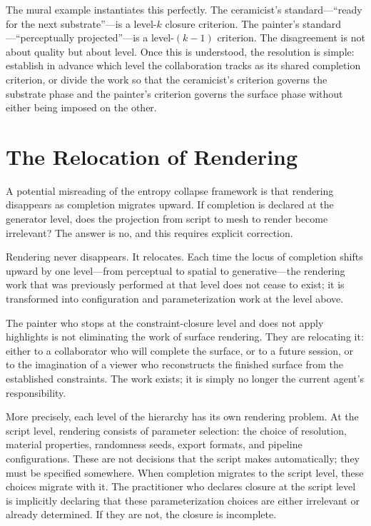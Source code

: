 \documentclass[12pt, twoside]{article}
\theoremstyle{plain}
\theoremstyle{definition}
\theoremstyle{remark}
\begin{document}
The mural example instantiates this perfectly. The ceramicist's standard---``ready for the next substrate''---is a level-$k$ closure criterion. The painter's standard---``perceptually projected''---is a level-$(k-1)$ criterion. The disagreement is not about quality but about level. Once this is understood, the resolution is simple: establish in advance which level the collaboration tracks as its shared completion criterion, or divide the work so that the ceramicist's criterion governs the substrate phase and the painter's criterion governs the surface phase without either being imposed on the other.

\section{The Relocation of Rendering}
\label{sec:relocation}

A potential misreading of the entropy collapse framework is that rendering disappears as completion migrates upward. If completion is declared at the generator level, does the projection from script to mesh to render become irrelevant? The answer is no, and this requires explicit correction.

Rendering never disappears. It relocates. Each time the locus of completion shifts upward by one level---from perceptual to spatial to generative---the rendering work that was previously performed at that level does not cease to exist; it is transformed into configuration and parameterization work at the level above.

The painter who stops at the constraint-closure level and does not apply highlights is not eliminating the work of surface rendering. They are relocating it: either to a collaborator who will complete the surface, or to a future session, or to the imagination of a viewer who reconstructs the finished surface from the established constraints. The work exists; it is simply no longer the current agent's responsibility.

More precisely, each level of the hierarchy has its own rendering problem. At the script level, rendering consists of parameter selection: the choice of resolution, material properties, randomness seeds, export formats, and pipeline configurations. These are not decisions that the script makes automatically; they must be specified somewhere. When completion migrates to the script level, these choices migrate with it. The practitioner who declares closure at the script level is implicitly declaring that these parameterization choices are either irrelevant or already determined. If they are not, the closure is incomplete.
\end{document}

